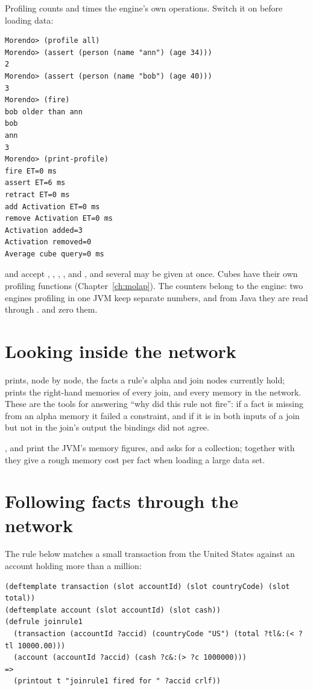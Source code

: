 Profiling counts and times the engine's own operations. Switch it on
before loading data:

\begin{lstlisting}[style=shell]
Morendo> (profile all)
Morendo> (assert (person (name "ann") (age 34)))
2
Morendo> (assert (person (name "bob") (age 40)))
3
Morendo> (fire)
bob older than ann
bob
ann
3
Morendo> (print-profile)
fire ET=0 ms
assert ET=6 ms
retract ET=0 ms
add Activation ET=0 ms
remove Activation ET=0 ms
Activation added=3
Activation removed=0
Average cube query=0 ms
\end{lstlisting}

 and  accept , ,
, ,  and
, and several may be given at once. Cubes have their
own profiling functions (Chapter~\ref{ch:molap}). The counters belong to
the engine: two engines profiling in one JVM keep separate numbers, and
from Java they are read through .
 and  zero them.

\section{Looking inside the network}

 prints, node by node, the facts a rule's alpha
and join nodes currently hold;  prints the right-hand
memories of every join, and  every memory in the network.
These are the tools for answering ``why did this rule not fire'': if a
fact is missing from an alpha memory it failed a constraint, and if it is
in both inputs of a join but not in the join's output the bindings did not
agree.

,  and  print the JVM's
memory figures, and  asks for a collection; together with
 they give a rough memory cost per fact when loading a
large data set.

\section{Following facts through the network}
\label{sec:network-walkthrough}

The rule below matches a small transaction from the United States
against an account holding more than a million:

\begin{lstlisting}
(deftemplate transaction (slot accountId) (slot countryCode) (slot total))
(deftemplate account (slot accountId) (slot cash))
(defrule joinrule1
  (transaction (accountId ?accid) (countryCode "US") (total ?tl&:(< ?tl 10000.00)))
  (account (accountId ?accid) (cash ?c&:(> ?c 1000000)))
=>
  (printout t "joinrule1 fired for " ?accid crlf))
\end{lstlisting}

